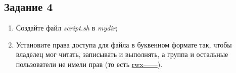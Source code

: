\documentclass[12pt, a4paper]{report}
\begin{document}
		\subsection*{Задание 4}
		\begin{enumerate}
			\item Создайте файл \textit{script.sh} в \textit{mydir};
			\item Установите права доступа для файла в буквенном формате так, чтобы владелец мог читать, записывать и выполнять, а группа и остальные пользователи не имели прав (то есть \underline{rwx------}).
		\end{enumerate}
		\lstset{style=mystyle}
		
\end{document}
